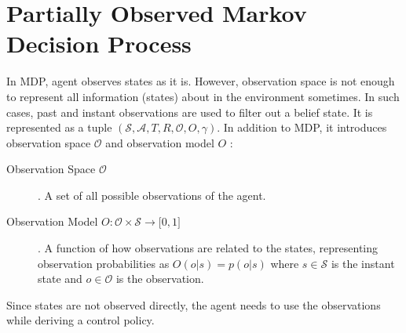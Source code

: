 \section{Partially Observed Markov Decision Process}
\label{sec:pomdp}

In MDP, agent observes states as it is. 
However, observation space is not enough to represent all information (states) about in the environment sometimes. 
In such cases, past and instant observations are used to filter out a belief state. 
It is represented as a tuple $(\mathcal{S},\mathcal{A},T,R,\mathcal{O},O,\gamma)$. 
In addition to MDP, it introduces observation space $\mathcal{O}$ and observation model $O$ \cite{francois-lavet_introduction_2018}: 

\begin{description}
	\item[Observation Space $\mathcal{O}$]. A set of all possible observations of the agent.
	\item[Observation Model $O \colon \mathcal{O} \times \mathcal{S} \rightarrow \lbrack 0,1 \rbrack$]. A function of how observations are related to the states, 
	representing observation probabilities as $O(o|s) = p(o|s)$ 
	where $s \in \mathcal{S}$ is the instant state and $o \in \mathcal{O}$ is the observation.
\end{description}

Since states are not observed directly, the agent needs to use the observations while deriving a control policy. 